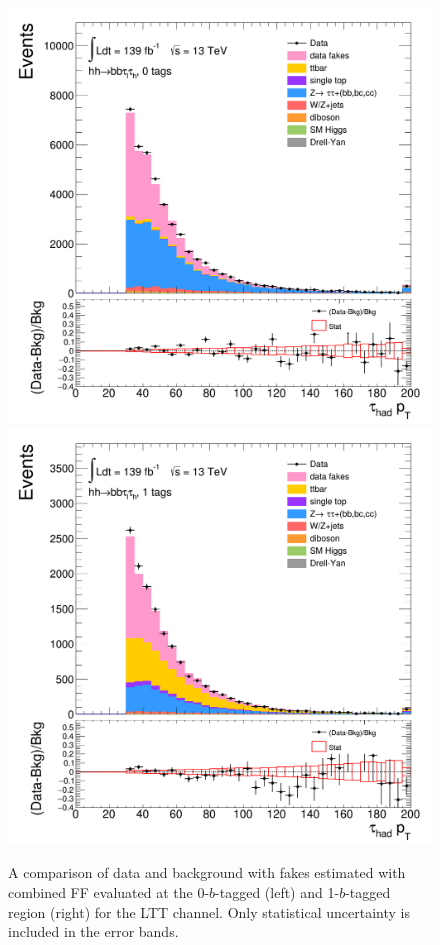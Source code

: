 \begin{figure}[htbp]
\centering
\includegraphics[width=.48\textwidth]{DiHiggs/plots/FF_CRs/SR_LTT_datafakes/HNone/BDTVarsHighMbb/0/C_0tag2pjet_0ptv_TauPt.png}
\includegraphics[width=.48\textwidth]{DiHiggs/plots/FF_CRs/SR_LTT_datafakes/HNone/BDTVarsHighMbb/1/C_1tag2pjet_0ptv_TauPt.png} \\
\caption{A comparison of data and background with fakes estimated with combined FF evaluated at the 0-$b$-tagged (left) 
and 1-$b$-tagged region (right) for the LTT channel.
Only statistical uncertainty is included in the error bands.  }
\label{fig:FFVRLTT}
\end{figure}









